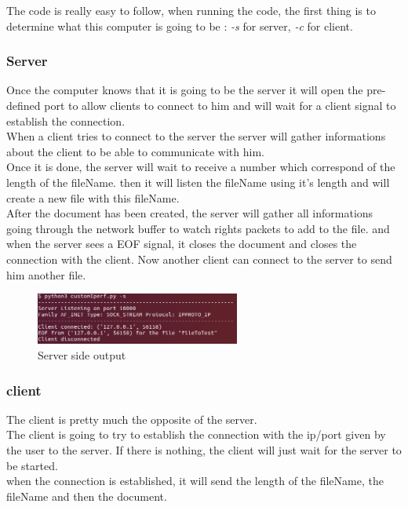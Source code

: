 \documentclass[a4paper]{article}
\begin{document}
\par The code is really easy to follow, when running the code, the first thing is to determine what this computer is going to be : \textit{-s} for server, \textit{-c} for client.


\subsubsection*{Server}

\par Once the computer knows that it is going to be the server it will open the pre-defined port to allow clients to connect to him and will wait for a client signal to establish the connection.\\
When a client tries to connect to the server the server will gather informations about the client to be able to communicate with him.\\
Once it is done, the server will wait to receive a number which correspond of the length of the fileName. then it will listen the fileName using it's length and will create a new file with this fileName.\\
After the document has been created, the server will gather all informations going through the network buffer to watch rights packets to add to the file. and when the server sees a EOF signal, it closes the document and closes the connection with the client.
Now another client can connect to the server to send him another file.

\begin{figure}
\centering
\includegraphics[width=0.6\textwidth]{serverSide.png}
\caption{Server side output}
\end{figure}

\subsubsection*{client}

\par The client is pretty much the opposite of the server.\\
The client is going to try to establish the connection with the ip/port given by the user to the server. If there is nothing, the client will just wait for the server to be started.\\
when the connection is established, it will send the length of the fileName, the fileName and then the document.
\end{document}
